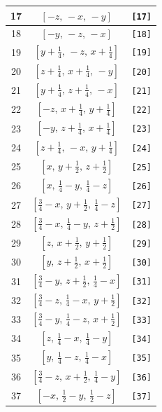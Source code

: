 \documentclass[fleqn,8pt]{jsarticle}
\begin{document}
\begin{longtable}{ccc}
17 & $\left[ - z,\, - x,\, - y \right]$ & {\tt [17]} \\ \hline
18 & $\left[ - y,\, - z,\, - x \right]$ & {\tt [18]} \\ \hline
19 & $\left[ y + \frac{1}{4},\, - z,\, x + \frac{1}{4} \right]$ & {\tt [19]} \\ \hline
20 & $\left[ z + \frac{1}{4},\, x + \frac{1}{4},\, - y \right]$ & {\tt [20]} \\ \hline
21 & $\left[ y + \frac{1}{4},\, z + \frac{1}{4},\, - x \right]$ & {\tt [21]} \\ \hline
22 & $\left[ - z,\, x + \frac{1}{4},\, y + \frac{1}{4} \right]$ & {\tt [22]} \\ \hline
23 & $\left[ - y,\, z + \frac{1}{4},\, x + \frac{1}{4} \right]$ & {\tt [23]} \\ \hline
24 & $\left[ z + \frac{1}{4},\, - x,\, y + \frac{1}{4} \right]$ & {\tt [24]} \\ \hline
25 & $\left[ x,\, y + \frac{1}{2},\, z + \frac{1}{2} \right]$ & {\tt [25]} \\ \hline
26 & $\left[ x,\, \frac{1}{4} - y,\, \frac{1}{4} - z \right]$ & {\tt [26]} \\ \hline
27 & $\left[ \frac{3}{4} - x,\, y + \frac{1}{2},\, \frac{1}{4} - z \right]$ & {\tt [27]} \\ \hline
28 & $\left[ \frac{3}{4} - x,\, \frac{1}{4} - y,\, z + \frac{1}{2} \right]$ & {\tt [28]} \\ \hline
29 & $\left[ z,\, x + \frac{1}{2},\, y + \frac{1}{2} \right]$ & {\tt [29]} \\ \hline
30 & $\left[ y,\, z + \frac{1}{2},\, x + \frac{1}{2} \right]$ & {\tt [30]} \\ \hline
31 & $\left[ \frac{3}{4} - y,\, z + \frac{1}{2},\, \frac{1}{4} - x \right]$ & {\tt [31]} \\ \hline
32 & $\left[ \frac{3}{4} - z,\, \frac{1}{4} - x,\, y + \frac{1}{2} \right]$ & {\tt [32]} \\ \hline
33 & $\left[ \frac{3}{4} - y,\, \frac{1}{4} - z,\, x + \frac{1}{2} \right]$ & {\tt [33]} \\ \hline
34 & $\left[ z,\, \frac{1}{4} - x,\, \frac{1}{4} - y \right]$ & {\tt [34]} \\ \hline
35 & $\left[ y,\, \frac{1}{4} - z,\, \frac{1}{4} - x \right]$ & {\tt [35]} \\ \hline
36 & $\left[ \frac{3}{4} - z,\, x + \frac{1}{2},\, \frac{1}{4} - y \right]$ & {\tt [36]} \\ \hline
37 & $\left[ - x,\, \frac{1}{2} - y,\, \frac{1}{2} - z \right]$ & {\tt [37]} \\ \hline

\end{longtable}
\end{document}
